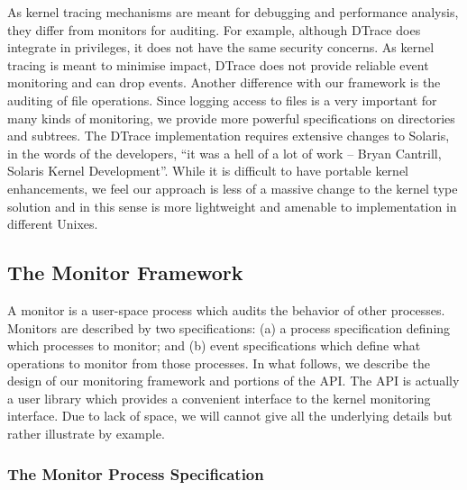 As kernel tracing mechanisms are meant for debugging and performance analysis,
they differ from monitors for auditing.
For example, although DTrace does integrate in privileges,
it does not have the same security concerns.
As kernel tracing is meant to minimise impact, DTrace does not provide
reliable event monitoring and can drop events.
Another difference with our framework is the auditing of file operations.
Since logging access to files is a very important for many kinds of monitoring,
we provide more powerful specifications on directories and subtrees.
The DTrace implementation requires extensive changes to Solaris, 
in the words of the developers, 
``it was a hell of a lot of work -- Bryan Cantrill, Solaris
Kernel Development''.
While it is difficult to have portable kernel enhancements, we feel our
approach is less of a massive change to the kernel type solution and in
this sense is more lightweight and amenable to implementation 
in different Unixes.



\subsection{The Monitor Framework}
\label{sec:framework}

A monitor is a user-space process which audits the behavior of other processes.
Monitors are described by two specifications:
(a) a process specification defining which processes to monitor; and
(b) event specifications which define what operations to monitor from
those processes.
In what follows, we describe the design of our monitoring framework and
portions of the API. The API is actually a user library which provides
a convenient interface to the kernel monitoring interface.
Due to lack of space, we will cannot give all the underlying
details but rather illustrate by example.

\subsubsection{The Monitor Process Specification}

